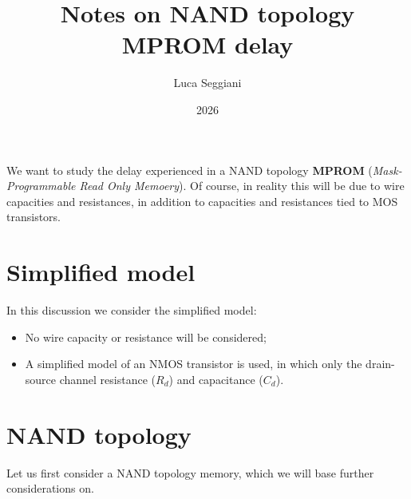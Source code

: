\documentclass[a4paper,11pt]{article}
\title{Notes on NAND topology MPROM delay}
\author{Luca Seggiani}
\date{2026}
\makeatletter
\renewcommand{\maketitle} {
	\begin{center} 
		\begin{minipage}[t]{.8\textwidth}
			\textsf{\huge\bfseries \@title} 
		\end{minipage}%
		\begin{minipage}[t]{.2\textwidth}
			\raggedleft \vspace{-1.65em}
			\textsf{\small \@author} \vfill
			\textsf{\small \@date}
		\end{minipage}
		\par
	\end{center}

	\thispagestyle{empty}
	\pagestyle{fancy}
}
\makeatother
\begin{document}
\pagestyle{fancy}
\maketitle

We want to study the delay experienced in a NAND topology \textbf{MPROM} (\textit{Mask-Programmable Read Only Memoery}).
Of course, in reality this will be due to wire capacities and resistances, in addition to capacities and resistances tied to MOS transistors.

\section{Simplified model}

In this discussion we consider the simplified model:
\begin{itemize}
	\item No wire capacity or resistance will be considered;
	\item A simplified model of an NMOS transistor is used, in which only the drain-source channel resistance ($R_d$) and capacitance ($C_d$).
\end{itemize}

\section{NAND topology}

Let us first consider a NAND topology memory, which we will base further considerations on.
\end{document}
